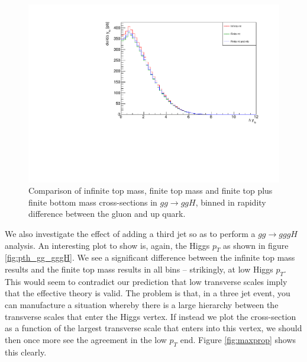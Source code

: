 \begin{figure}[H]
\centering
\includegraphics[scale=0.7]{Images/ydiff_gg.pdf}
\caption{Comparison of infinite top mass, finite top mass and finite top plus finite bottom mass cross-sections in $gg \to ggH$, binned in rapidity difference between the gluon and up quark.}
\label{fig:ydiff_gg}
\end{figure}
We also investigate the effect of adding a third jet so as to perform a $gg \to gggH$ analysis. An interesting plot to show is, again, the Higgs $p_T$ as shown in figure \ref{fig:pth_gg_gggH}. We see a significant difference between the infinite top mass results and the finite top mass results in all bins -- strikingly, at low Higgs $p_T$. This would seem to contradict our prediction that low transverse scales imply that the effective theory is valid. The problem is that, in a three jet event, you can manufacture a situation whereby there is a large hierarchy between the transverse scales that enter the Higgs vertex. If instead we plot the cross-section as a function of the largest transverse scale that enters into this vertex, we should then once more see the agreement in the low $p_T$ end. Figure \ref{fig:maxprop} shows this clearly. %

